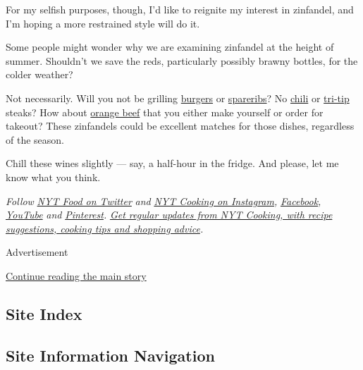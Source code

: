 For my selfish purposes, though, I'd like to reignite my interest in
zinfandel, and I'm hoping a more restrained style will do it.

Some people might wonder why we are examining zinfandel at the height of
summer. Shouldn't we save the reds, particularly possibly brawny
bottles, for the colder weather?

Not necessarily. Will you not be grilling
\href{https://cooking.nytimes3xbfgragh.onion/recipes/1016596-hamburgers-tavern-style?action=click\&module=Local\%20Search\%20Recipe\%20Card\&pgType=search\&rank=2}{burgers}
or
\href{https://cooking.nytimes3xbfgragh.onion/recipes/1014252-balsamic-glazed-oven-baked-ribs?action=click\&module=Global\%20Search\%20Recipe\%20Card\&pgType=search\&rank=2}{spareribs}?
No
\href{https://cooking.nytimes3xbfgragh.onion/guides/48-how-to-make-chili}{chili}
or
\href{https://cooking.nytimes3xbfgragh.onion/recipes/1013313-santa-maria-style-grilled-tri-tip}{tri-tip}
steaks? How about
\href{https://cooking.nytimes3xbfgragh.onion/recipes/1017697-orange-beef}{orange
beef} that you either make yourself or order for takeout? These
zinfandels could be excellent matches for those dishes, regardless of
the season.

Chill these wines slightly --- say, a half-hour in the fridge. And
please, let me know what you think.

\emph{Follow} \emph{\href{https://twitter.com/nytfood}{NYT Food on
Twitter}} \emph{and}
\emph{\href{https://www.instagram.com/nytcooking/}{NYT Cooking on
Instagram},}
\emph{\href{https://www.facebookcorewwwi.onion/nytcooking/}{Facebook},}
\emph{\href{https://www.youtube.com/nytcooking}{YouTube}} \emph{and}
\emph{\href{https://www.pinterest.com/nytcooking/}{Pinterest}.}
\emph{\href{https://www.nytimes3xbfgragh.onion/newsletters/cooking}{Get
regular updates from NYT Cooking, with recipe suggestions, cooking tips
and shopping advice}.}

Advertisement

\protect\hyperlink{after-bottom}{Continue reading the main story}

\hypertarget{site-index}{%
\subsection{Site Index}\label{site-index}}

\hypertarget{site-information-navigation}{%
\subsection{Site Information
Navigation}\label{site-information-navigation}}

